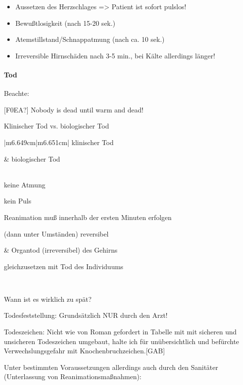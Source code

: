 \documentclass{article}
\begin{document}
\begin{itemize}
\item Aussetzen des Herzschlages ={\textgreater} Patient ist sofort
pulslos!

\item Bewu{\ss}tlosigkeit (nach 15-20 sek.)

\item Atemstillstand/Schnappatmung (nach ca. 10 sek.)

\item Irreversible Hirnsch\"aden nach 3-5 min., bei K\"alte allerdings
l\"anger!

\end{itemize}
\paragraph{Tod}
Beachte:

[F0EA?] Nobody is dead until warm and dead!

Klinischer Tod vs. biologischer Tod

\begin{center}
\tablehead{}\begin{supertabular}{|m{6.649cm}|m{6.651cm}|}
\hline
\centering klinischer Tod\par

 &
\centering biologischer Tod\par

\\\hline
keine Atmung

kein Puls

Reanimation mu{\ss} innerhalb der ersten  Minuten erfolgen

(dann unter Umst\"anden) reversibel

 &
Organtod (irreversibel) des Gehirns

gleichzusetzen mit Tod des Individuums

\\\hline
\end{supertabular}
\end{center}
Wann ist es wirklich zu sp\"at?

Todesfeststellung: Grunds\"atzlich NUR durch den Arzt!

Todeszeichen: Nicht wie von Roman gefordert in Tabelle mit mit sicheren
und unsicheren Todeszeichen umgebaut, halte ich f\"ur un\"ubersichtlich
und bef\"urchte Verwechslungsgefahr mit Knochenbruchzeichen.[GAB]

Unter bestimmten Voraussetzungen allerdings auch durch den Sanit\"ater
(Unter\-lassung von  Reanimationsma{\ss}nahmen):
\end{document}
